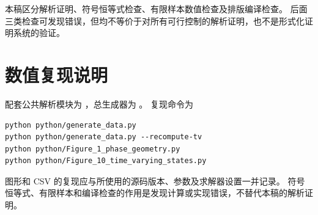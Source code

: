 \documentclass[11pt,a4paper,UTF8]{ctexart}
\theoremstyle{definition}
\begin{document}
本稿区分解析证明、符号恒等式检查、有限样本数值检查及排版编译检查。
后面三类检查可发现错误，但均不等价于对所有可行控制的解析证明，也不是形式化证明系统的验证。

\ifdefined\TheoryOnly\else
\section{数值复现说明}
配套公共解析模块为 ，总生成器为 。
复现命令为
\begin{lstlisting}
python python/generate_data.py
python python/generate_data.py --recompute-tv
python python/Figure_1_phase_geometry.py
python python/Figure_10_time_varying_states.py
\end{lstlisting}
图形和 CSV 的复现应与所使用的源码版本、参数及求解器设置一并记录。
符号恒等式、有限样本和编译检查的作用是发现计算或实现错误，不替代本稿的解析证明。
\fi


\end{document}
